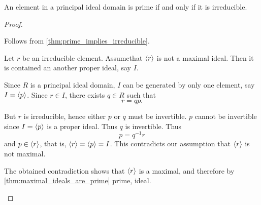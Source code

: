 \begin{proposition}\label{thm:pid_prime_iff_irreducible}
  An element in a principal ideal domain is prime if and only if it is irreducible.
\end{proposition}
\begin{proof}
  \begin{description}
    \Implies Follows from \cref{thm:prime_implies_irreducible}.

    \ImpliedBy Let \( r \) be an irreducible element. Assume\LEM that \( \left\langle r \right\rangle \) is not a maximal ideal. Then it is contained an another proper ideal, say \( I \).

    Since \( R \) is a principal ideal domain, \( I \) can be generated by only one element, say \( I = \left\langle p \right\rangle \). Since \( r \in I \), there exists \( q \in R \) such that
    \begin{equation*}
      r = qp.
    \end{equation*}

    But \( r \) is irreducible, hence either \( p \) or \( q \) must be invertible. \( p \) cannot be invertible since \( I = \left\langle p \right\rangle \) is a proper ideal. Thus \( q \) is invertible. Thus
    \begin{equation*}
      p = q^{-1} r
    \end{equation*}
    and \( p \in \left\langle r \right\rangle \), that is, \( \left\langle r \right\rangle = \left\langle p \right\rangle = I \). This contradicts our assumption that \( \left\langle r \right\rangle \) is not maximal.

    The obtained contradiction shows that \( \left\langle r \right\rangle \) is a maximal, and therefore by \cref{thm:maximal_ideals_are_prime} prime, ideal.
  \end{description}
\end{proof}
